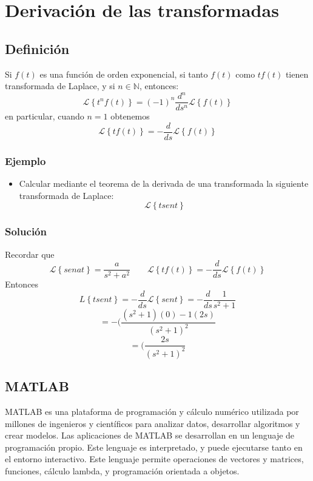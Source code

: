 \documentclass[12pt,a4paper,twoside,onecolumn,openany]{book}
\begin{document}
\chapter{Derivación de las transformadas}
\section{Definición}
Si $f(t)$ es una función de orden exponencial, si tanto $f(t)$ como $tf(t)$ tienen transformada de Laplace, y si $n\in \mathbb {N} $, entonces:
\[
    \mathcal { L } \left\lbrace { t^{n}{ f ( t )  }}\right\rbrace = (-1)^{n} \frac{d^{n}}{ds^{n}} \mathcal { L }  \left\lbrace { f ( t )  }\right\rbrace
\]
en particular, cuando $n=1$ obtenemos
\[
    \mathcal { L } \left\lbrace { t{ f ( t )  }}\right\rbrace = -\frac{d}{ds} \mathcal { L }  \left\lbrace { f ( t )  }\right\rbrace
\]
\subsection{Ejemplo}
\begin{itemize}
\item Calcular mediante el teorema de la derivada de una transformada la  siguiente transformada de Laplace:
\[
    \mathcal { L } \left\lbrace { t sen t   }\right\rbrace  
\]
\end{itemize}
\subsection{Solución}
Recordar que
\[
    \mathcal { L } \left\lbrace { sen a t   }\right\rbrace = \frac{a}{s^{2}+a^{2}}  \qquad \mathcal { L } \left\lbrace { t{ f ( t )  }}\right\rbrace = -\frac{d}{ds} \mathcal { L }  \left\lbrace { f ( t )  }\right\rbrace
\]
Entonces
\[
{ L } \left\lbrace { t{ sen t   }}\right\rbrace = -\frac{d}{ds} \mathcal { L }  \left\lbrace { sen t   }\right\rbrace=  -\frac{d}{ds} \frac{1}{s^{2}+1}
\]
\[
=-(\frac{(s^{2}+1)(0)-1(2s)}{(s^{2}+1)^2}
\]
\[
=(\frac{2s}{(s^{2}+1)^2}
\]
\section{MATLAB}
MATLAB es una plataforma de programación y cálculo numérico utilizada por millones de ingenieros y científicos para analizar datos, desarrollar algoritmos y crear modelos.
Las aplicaciones de MATLAB se desarrollan en un lenguaje de programación propio. Este lenguaje es interpretado, y puede ejecutarse tanto en el entorno interactivo. Este lenguaje permite operaciones de vectores y matrices, funciones, cálculo lambda, y programación orientada a objetos.\\
\\
\end{document}
